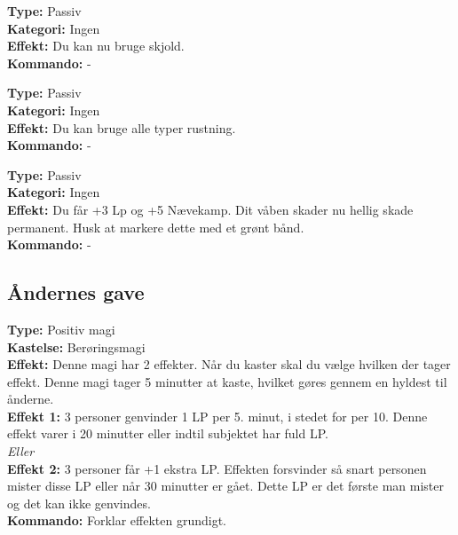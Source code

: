 \begin{orleks arv*}
\textbf{Type:} Passiv\\
\textbf{Kategori:} Ingen\\
\textbf{Effekt:} Du kan nu bruge skjold.\\
\textbf{Kommando:} -
\end{orleks arv*}

\begin{orleks arv*}
\textbf{Type:} Passiv\\
\textbf{Kategori:} Ingen\\
\textbf{Effekt:} Du kan bruge alle typer rustning.\\
\textbf{Kommando:} -
\end{orleks arv*}

\begin{orleks arv*}
\textbf{Type:} Passiv\\
\textbf{Kategori:} Ingen\\
\textbf{Effekt:} Du får +3 Lp og +5 Nævekamp. Dit våben skader nu hellig skade permanent. Husk at markere dette med et grønt bånd.\\
\textbf{Kommando:} -
\end{orleks arv*}

\subsection*{Åndernes gave}

\begin{åndens gave*}
\textbf{Type:} Positiv magi\\
\textbf{Kastelse:} Berøringsmagi\\
\textbf{Effekt:} Denne magi har 2 effekter. Når du kaster skal du vælge hvilken der tager effekt. Denne magi tager 5 minutter at kaste, hvilket gøres gennem en hyldest til ånderne.\\
\textbf{Effekt 1:} 3 personer genvinder 1 LP per 5. minut, i stedet for per 10. Denne effekt varer i 20 minutter eller indtil subjektet har fuld LP.\\
\emph{\textit{Eller}}\\
\textbf{Effekt 2:} 3 personer får +1 ekstra LP. Effekten forsvinder så snart personen mister disse LP eller når 30 minutter er gået. Dette LP er det første man mister og det kan ikke genvindes.\\
\textbf{Kommando:} Forklar effekten grundigt.\\
\end{åndens gave*}

